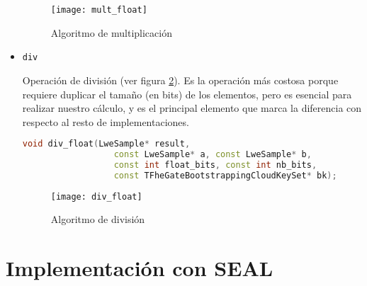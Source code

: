 \begin{itemize}
  \begin{figure}[h]
    \texttt{[image: mult\_float]}
    \caption{Algoritmo de multiplicación}
    \label{fig:mult_float}
  \end{figure}

  \item \texttt{div}

  Operación de división (ver figura \ref{fig:div_float}). Es la operación más costosa porque requiere duplicar el tamaño (en bits) de los elementos, pero es esencial para realizar nuestro cálculo, y es el principal elemento que marca la diferencia con respecto al resto de implementaciones.

  \begin{lstlisting}[language=c++]
  void div_float(LweSample* result,
                  const LweSample* a, const LweSample* b,
                  const int float_bits, const int nb_bits,
                  const TFheGateBootstrappingCloudKeySet* bk);
  \end{lstlisting}

  \begin{figure}[h]
    \texttt{[image: div\_float]}
    \caption{Algoritmo de división}
    \label{fig:div_float}
  \end{figure}


\end{itemize}

\section{Implementación con SEAL}

